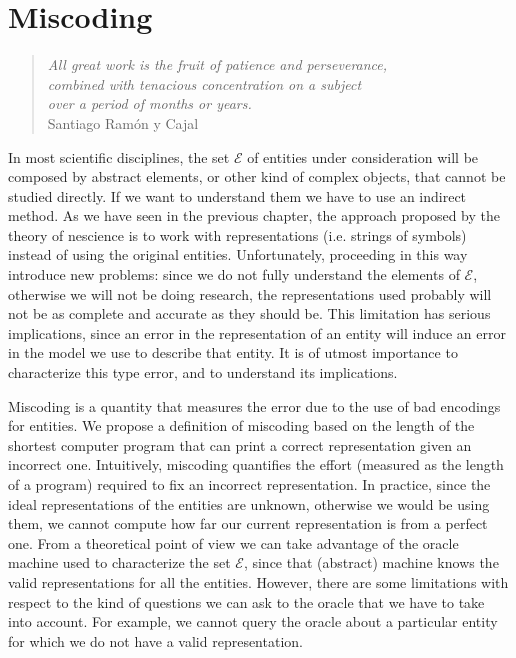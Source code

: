 %
%


\chapter{Miscoding}
\label{chap:Miscoding}

\begin{quote}
    \begin{flushright}
        \emph{All great work is the fruit of patience and perseverance,\\
            combined with tenacious concentration on a subject\\
            over a period of months or years.}\\
        Santiago Ramón y Cajal
    \end{flushright}
\end{quote}
\bigskip

In most scientific disciplines, the set $\mathcal{E}$ of entities under consideration will be composed by abstract elements, or other kind of complex objects, that cannot be studied directly. If we want to understand them we have to use an indirect method. As we have seen in the previous chapter, the approach proposed by the theory of nescience is to work with representations (i.e. strings of symbols) instead of using the original entities. Unfortunately, proceeding in this way introduce new problems: since we do not fully understand the elements of $\mathcal{E}$, otherwise we will not be doing research, the representations used probably will not be as complete and accurate as they should be. This limitation has serious implications, since an error in the representation of an entity will induce an error in the model we use to describe that entity. It is of utmost importance to characterize this type error, and to understand its implications.

Miscoding is a quantity that measures the error due to the use of bad encodings for entities. We propose a definition of miscoding based on the length of the shortest computer program that can print a correct representation given an incorrect one. Intuitively, miscoding quantifies the effort (measured as the length of a program) required to fix an incorrect representation. In practice, since the ideal representations of the entities are unknown, otherwise we would be using them, we cannot compute how far our current representation is from a perfect one. From a theoretical point of view we can take advantage of the oracle machine used to characterize the set $\mathcal{E}$, since that (abstract) machine knows the valid representations for all the entities. However, there are some limitations with respect to the kind of questions we can ask to the oracle that we have to take into account. For example, we cannot query the oracle about a particular entity for which we do not have a valid representation.

